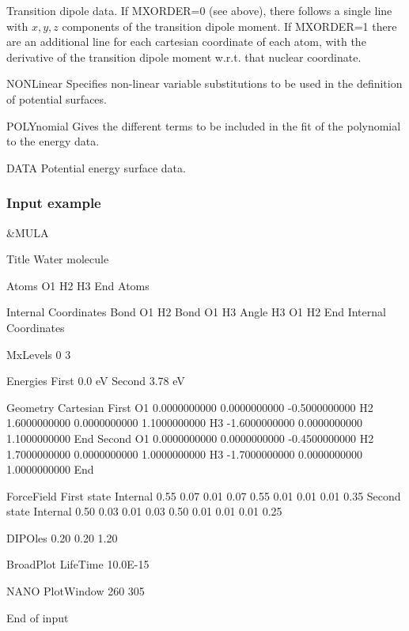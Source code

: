 \begin{keywordlist}
Transition dipole data. If MXORDER=0 (see above), there follows a single line
with $x,y,z$ components of the transition dipole moment. If MXORDER=1 there
are an additional line for each cartesian coordinate of each atom, with the
derivative of the transition dipole moment w.r.t. that nuclear coordinate.
\item[NONLinear]
Specifies non-linear variable substitutions to be used in the definition of
potential surfaces.
\item[POLYnomial]
Gives the different terms to be included in the fit of the polynomial
to the energy data.
\item[DATA]
Potential energy surface data.

\end{keywordlist}


\subsubsection{Input example}

\begin{inputlisting}
 &MULA

Title
 Water molecule

Atoms
 O1
 H2
 H3
End Atoms

Internal Coordinates
 Bond  O1 H2
 Bond  O1 H3
 Angle H3 O1 H2
End Internal Coordinates

MxLevels
  0  3

Energies
 First
  0.0 eV
 Second
  3.78 eV

Geometry
 Cartesian
 First
  O1     0.0000000000      0.0000000000     -0.5000000000
  H2     1.6000000000      0.0000000000      1.1000000000
  H3    -1.6000000000      0.0000000000      1.1000000000
 End
 Second
  O1     0.0000000000      0.0000000000     -0.4500000000
  H2     1.7000000000      0.0000000000      1.0000000000
  H3    -1.7000000000      0.0000000000      1.0000000000
 End

ForceField
 First state
 Internal
  0.55 0.07 0.01
  0.07 0.55 0.01
  0.01 0.01 0.35
 Second state
 Internal
  0.50 0.03 0.01
  0.03 0.50 0.01
  0.01 0.01 0.25

DIPOles
  0.20 0.20 1.20

BroadPlot
LifeTime
 10.0E-15

NANO
PlotWindow
 260 305

End of input

\end{inputlisting}

